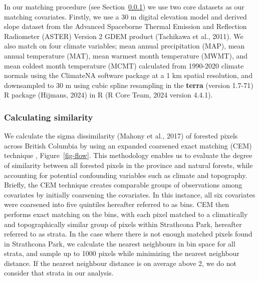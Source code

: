 \documentclass[
]{agujournal2019}
\begin{document}
In our matching procedure (see Section~\ref{sec-sim}) we use two core
datasets as our matching covariates. Firstly, we use a 30 m digital
elevation model and derived slope dataset from the Advanced Spaceborne
Thermal Emission and Reflection Radiometer (ASTER) Version 2 GDEM
product (Tachikawa et al., 2011). We also match on four climate
variables; mean annual precipitation (MAP), mean annual temperature
(MAT), mean warmest month temperature (MWMT), and mean coldest month
temperature (MCMT) calculated from 1990-2020 climate normals using the
ClimateNA software package at a 1 km spatial resolution, and downsampled
to 30 m using cubic spline resampling in the \textbf{terra} (version
1.7-71) R package (Hijmans, 2024) in R (R Core Team, 2024 version
4.4.1).

\subsubsection{Calculating similarity}\label{sec-sim}

We calculate the sigma dissimilarity (Mahony et al., 2017) of forested
pixels across British Columbia by using an expanded coarsened exact
matching (CEM) technique , Figure~\ref{fig-flow}. This methodology
enables us to evaluate the degree of similarity between all forested
pixels in the province and natural forests, while accounting for
potential confounding variables such as climate and topography. Briefly,
the CEM technique creates comparable groups of observations among
covariates by initially coarsening the covariates. In this instance, all
six covariates were coarsened into five quintiles hereafter referred to
as bins. CEM then performs exact matching on the bins, with each pixel
matched to a climatically and topographically similar group of pixels
within Strathcona Park, hereafter referred to as strata. In the case
where there is not enough matched pixels found in Strathcona Park, we
calculate the nearest neighbours in bin space for all strata, and sample
up to 1000 pixels while minimizing the nearest neighbour distance. If
the nearest neighbour distance is on average above 2, we do not consider
that strata in our analysis.
\end{document}
